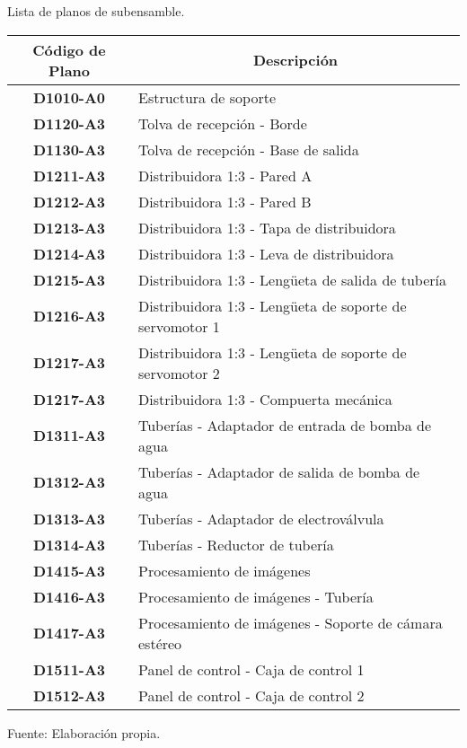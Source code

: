 \begin{mytable}[H]
	\footnotesize\centering
	\caption{Lista de planos de subensamble.}
	\label{tab:lista de planos de subensamble}
	\begin{tabular}{|c|l|}
		\hline
		\multicolumn{1}{|c|}{\textbf{Código de Plano}} & \multicolumn{1}{c|}{\textbf{Descripción}} \\ \hline
		\textbf{D1010-A0}         & Estructura de soporte  \\ \hline
		\textbf{D1120-A3}         & Tolva de recepción - Borde \\ \hline
		\textbf{D1130-A3}         & Tolva de recepción - Base de salida \\ \hline
		\textbf{D1211-A3}         & Distribuidora 1:3 - Pared A \\ \hline
		\textbf{D1212-A3}         & Distribuidora 1:3 - Pared B \\ \hline
		\textbf{D1213-A3}         & Distribuidora 1:3 - Tapa de distribuidora \\ \hline
		\textbf{D1214-A3}         & Distribuidora 1:3 - Leva de distribuidora \\ \hline
		\textbf{D1215-A3}         & Distribuidora 1:3 - Lengüeta de salida de tubería \\ \hline
		\textbf{D1216-A3}         & Distribuidora 1:3 - Lengüeta de soporte de servomotor 1 \\ \hline
		\textbf{D1217-A3}         & Distribuidora 1:3 - Lengüeta de soporte de servomotor 2 \\ \hline 
		\textbf{D1217-A3}         & Distribuidora 1:3 - Compuerta mecánica \\ \hline 
		\textbf{D1311-A3}         & Tuberías - Adaptador de entrada de bomba de agua \\ \hline 
		\textbf{D1312-A3}         & Tuberías - Adaptador de salida de bomba de agua \\ \hline 
		\textbf{D1313-A3}         & Tuberías - Adaptador de electroválvula\\ \hline
		\textbf{D1314-A3}         & Tuberías - Reductor de tubería \\ \hline
		\textbf{D1415-A3}         & Procesamiento de imágenes \\ \hline
		\textbf{D1416-A3}         & Procesamiento de imágenes - Tubería \\ \hline
		\textbf{D1417-A3}         & Procesamiento de imágenes - Soporte de cámara estéreo \\ \hline
		\textbf{D1511-A3}         & Panel de control - Caja de control 1 \\ \hline
		\textbf{D1512-A3}         & Panel de control - Caja de control 2 \\ \hline
	\end{tabular}
	\begin{myflushcenteraftertable}	
		Fuente: Elaboración propia.
	\end{myflushcenteraftertable}
\end{mytable}

